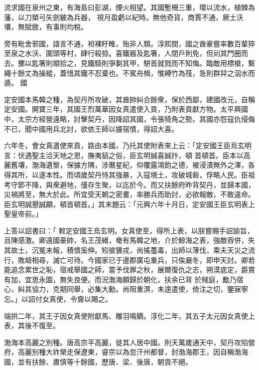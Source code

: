 
\begin{pinyinscope}

 流求國在泉州之東，有海島曰彭湖，煙火相望。其國塹柵三重，環以流水，植棘為藩，以刀槊弓矢劍鈹為兵器，
 視月盈虧以紀時。無他奇貨，商賈不通，厥土沃壤，無賦斂，有事則均稅。



 旁有毗舍邪國，語言不通，袒裸盱睢，殆非人類。淳熙間，國之酋豪嘗率數百輩猝至泉之水沃、圍頭等村，肆行殺掠。喜鐵器及匙箸，人閉戶則免，但刓其門圈而去。擲以匙箸則頫拾之，見鐵騎則爭剚其甲，駢首就戮而不知悔。臨敵用標槍，繫繩十餘丈為操縱，蓋惜其鐵不忍棄也。不駕舟楫，惟縛竹為筏，急則群舁之泅水而遁。
 國



 定安國本馬韓之種，為契丹所攻破，其酋帥糾合餘衆，保於西鄙，建國改元，自稱定安國。開寶三年，其國王烈萬華因女真遣使入貢，乃附表貢獻方物。太平興國中，太宗方經營遠略，討擊契丹，因降詔其國，令張犄角之勢。其國亦怨寇仇侵侮不已，聞中國用兵北討，欲依王師以攄宿憤，得詔大喜。



 六年冬，會女真遣使來貢，路由本國，乃托其使附表來上云：「定安國王臣烏玄明言：伏遇聖主洽天地之恩，撫夷貊之俗，臣玄明誠喜誠抃，頓
 首頓首。臣本以高麗舊壤，渤海遺黎，保據方隅，涉曆星紀，仰覆露鴻鈞之德，被浸漬無外之澤，各得其所，以遂本性。而頃歲契丹恃其強暴，入寇境土，攻破城砦，俘略人民。臣祖考守節不降，與衆避地，僅存生聚，以迄於今。而又扶餘府昨背契丹，並歸本國，災禍將至，無大於此。所宜受天朝之密畫，率勝兵而助討，必欲報敵，不敢違命。臣玄明誠懇誠願，頓首頓首。」其末題云：「元興六年十月日，定安國王臣玄明表上聖皇帝前。」



 上答以詔書曰：「
 敕定安國王烏玄明。女真使至，得所上表，以朕嘗賜手詔諭旨，且陳感激。卿遠國豪帥，名王茂緒，奄有馬韓之地，介於鯨海之表，強敵吞併，失其故土，沉冤未報，積憤奚伸。矧彼獯戎，尚搖蠆毒，出師以薄伐，乘夫天災之流行，敗衄相尋，滅亡可待。今國家已于邊郡廣屯重兵，只俟嚴冬，即申天討。卿若能追念累世之恥，宿戒舉國之師，當予伐罪之秋，展爾復仇之志，朔漠底定，爵賞有加，宜思永圖，無失良便。而況渤海願歸於朝化，扶余已背
 於賊庭，勵乃宿心，糾其協力，克期同舉，必集大勳。尚阻重溟，未遑遣使，倚注之切，鑒寐寧忘。」以詔付女真使，令齎以賜之。



 端拱二年，其王子因女真使附獻馬、雕羽鳴鏑。淳化二年，其五子太元因女真使上表，其後不復至。



 渤海本高麗之別種。唐高宗平高麗，徙其人居中國。則天萬歲通天中，契丹攻陷營府，高麗別種大祚榮走保遼東，睿宗以為忽汗州都督，封渤海郡王，因自稱渤海國，並有扶餘、肅慎等十餘國，歷唐、梁、後唐，朝貢不絕。




\end{pinyinscope}
